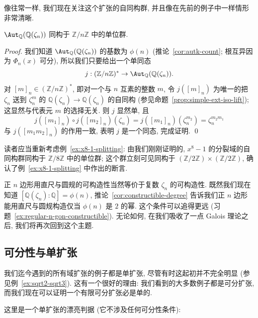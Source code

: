 像往常一样, 我们现在关注这个扩张的自同构群, 并且像在先前的例子中一样情形非常清晰.

\begin{proposition}\label{prop:aut-cyclotomic}
$\Aut_{\mathbb{Q}}(\mathbb{Q}(\zeta_n))$ 同构于 $\mathbb{Z}/n\mathbb{Z}$ 中的单位群.
\end{proposition}

\begin{proof}
我们知道 $\Aut_{\mathbb{Q}}(\mathbb{Q}(\zeta_n))$ 的基数为 $\phi(n)$ (推论~\ref{cor:autk-count}; 根互异因为 $\Phi_n(x)$ 可分), 所以我们只要给出一个单同态
\[
j:(\mathbb{Z}/n\mathbb{Z})^*\to\Aut_{\mathbb{Q}}(\mathbb{Q}(\zeta_n)).
\]
对 $[m]_n\in(\mathbb{Z}/n\mathbb{Z})^*$, 即对一个与 $n$ 互素的整数 $m$, 令 $j([m]_n)$ 为唯一的把 $\zeta_n$ 送到 $\zeta_n^m$ 的 $\mathbb{Q}(\zeta_n)\to\mathbb{Q}(\zeta_n)$ 的自同构 (参见命题~\ref{prop:simple-ext-iso-lift});
这显然与代表元 $m$ 的选择无关. 则 $j$ 显然单, 且
\[
j([m_1]_n)\circ j([m_2]_n)(\zeta_n)=j([m_1]_n)(\zeta_n^{m_2})=\zeta_n^{m_2m_1}
\]
与 $j([m_1m_2]_n)$ 的作用一致, 表明 $j$ 是一个同态, 完成证明. \qed
\end{proof}

\begin{example}\label{ex:splitting-x8-1-aut}
读者应当重新考虑例~\ref{ex:x8-1-splitting}: 由我们刚刚证明的, $x^8-1$ 的分裂域的自同构群同构于 $\mathbb{Z}/8\mathbb{Z}$ 中的单位群; 这个群立刻可见同构于 $(\mathbb{Z}/2\mathbb{Z})\times(\mathbb{Z}/2\mathbb{Z})$, 确认了例~\ref{ex:x8-1-splitting} 中作出的断言.
\end{example}

正 $n$ 边形用直尺与圆规的可构造性当然等价于复数 $\zeta_n$ 的可构造性. 既然我们现在知道 $[\mathbb{Q}(\zeta_n):\mathbb{Q}]=\phi(n)$, 推论~\ref{cor:constructible-degree} 告诉我们正 $n$ 边形能用直尺与圆规构造仅当 $\phi(n)$ 是 $2$ 的幂. 这个条件可以追得更远 (习题~\ref{ex:regular-n-gon-constructible}). 无论如何, 在我们吸收了一点 Galois 理论之后, 我们将再次回到这个主题.

\subsection{可分性与单扩张}\label{subsec:separability-simple}

我们迄今遇到的所有域扩张的例子都是单扩张, 尽管有时这起初并不完全明显 (参见例~\ref{ex:sqrt2-sqrt3}). 这有一个很好的理由: 我们看到的大多数例子都是可分扩张, 而我们现在可以证明一个有限可分扩张必是单的.

这里是一个单扩张的漂亮判据 (它不涉及任何可分性条件):

